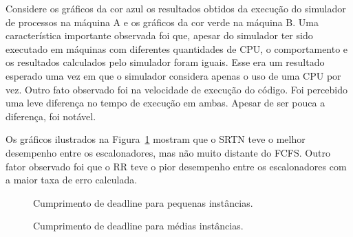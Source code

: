 \documentclass[12pt]{article}
\begin{document}
Considere os gráficos da cor azul os resultados obtidos da execução do simulador de processos na máquina A e os gráficos da cor verde na máquina B. Uma característica importante observada foi que, apesar do simulador ter sido executado em máquinas com diferentes quantidades de CPU, o comportamento e os resultados calculados pelo simulador foram iguais. Esse era um resultado esperado uma vez em que o simulador considera apenas o uso de uma CPU por vez. Outro fato observado foi na velocidade de execução do código. Foi percebido uma leve diferença no tempo de execução em ambas. Apesar de ser pouca a diferença, foi notável.

Os gráficos ilustrados na Figura~\ref{fig:cdS} mostram que o SRTN teve o melhor desempenho entre os escalonadores, mas não muito distante do FCFS. Outro fator observado foi que o RR teve o pior desempenho entre os escalonadores com a maior taxa de erro calculada.

\begin{figure}[H]
	\centering
	\hfill
	\caption{Cumprimento de deadline para pequenas instâncias.}
	\label{fig:cdS}
\end{figure}

\begin{figure}
	\centering
	\hfill
	\caption{Cumprimento de deadline para médias instâncias.}
	\label{fig:cdM}
\end{figure}
\end{document}
